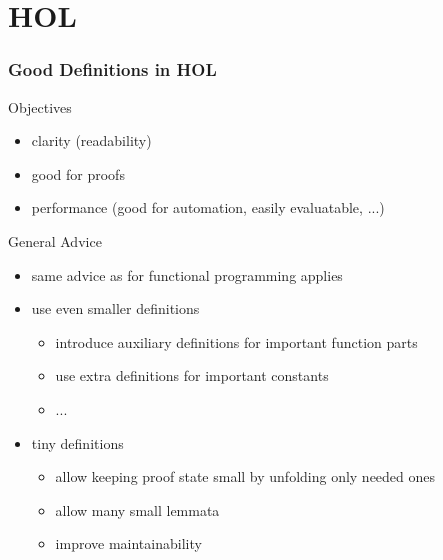 \section{HOL}

\begin{frame}
\frametitle{Good Definitions in HOL}

\begin{block}{Objectives}
\begin{itemize}
\item clarity (readability)
\item good for proofs 
\item performance (good for automation, easily evaluatable, ...)
\end{itemize}
\end{block}

\begin{block}{General Advice}
\begin{itemize}
\item same advice as for functional programming applies
\item use even smaller definitions
\begin{itemize}
\item introduce auxiliary definitions for important function parts
\item use extra definitions for important constants
\item ...
\end{itemize}
\item tiny definitions
\begin{itemize}
\item allow keeping proof state small by unfolding only needed ones
\item allow many small lemmata
\item improve maintainability
\end{itemize}
\end{itemize}
\end{block}
\end{frame}


